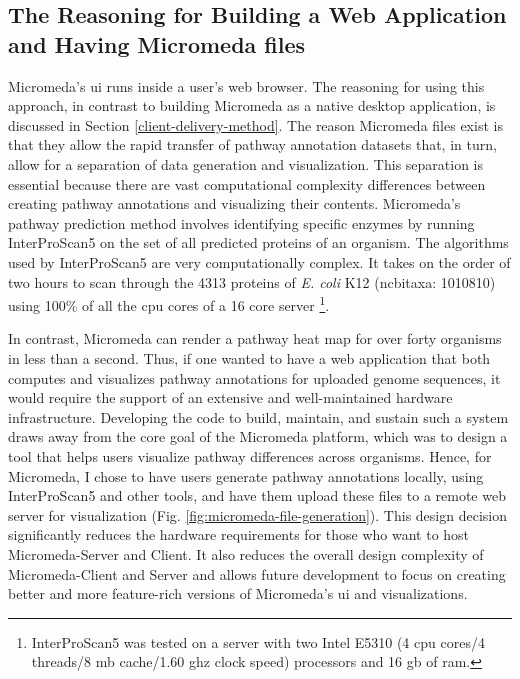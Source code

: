 \subsection{The Reasoning for Building a Web Application and Having Micromeda files} \label{why-micromeda-files}

Micromeda's \gls{ui} runs inside a user's web browser. The reasoning for using this approach, in contrast to building Micromeda as a native desktop application, is discussed in Section \ref{client-delivery-method}. The reason Micromeda files exist is that they allow the rapid transfer of pathway annotation datasets that, in turn, allow for a separation of data generation and visualization. This separation is essential because there are vast computational complexity differences between creating pathway annotations and visualizing their contents. Micromeda's pathway prediction method involves identifying specific enzymes by running InterProScan5 on the set of all predicted proteins of an organism. The algorithms used by InterProScan5 are very computationally complex. It takes on the order of two hours to scan through the 4313 proteins of \textit{E. coli} K12 (\gls{ncbitaxa}: 1010810) using 100\% of all the \gls{cpu} cores of a 16 core server \footnote{InterProScan5 was tested on a server with two Intel E5310 (4 \gls{cpu} cores/4 threads/8 \gls{mb} cache/1.60 \gls{ghz} clock speed) processors and 16 \gls{gb}  of \gls{ram}.}.

In contrast, Micromeda can render a pathway heat map for over forty organisms in less than a second. Thus, if one wanted to have a web application that both computes and visualizes pathway annotations for uploaded genome sequences, it would require the support of an extensive and well-maintained hardware infrastructure. Developing the code to build, maintain, and sustain such a system draws away from the core goal of the Micromeda platform, which was to design a tool that helps users visualize pathway differences across organisms. Hence, for Micromeda, I chose to have users generate pathway annotations locally, using InterProScan5 and other tools, and have them upload these files to a remote web server for visualization (Fig. \ref{fig:micromeda-file-generation}). This design decision significantly reduces the hardware requirements for those who want to host Micromeda-Server and Client. It also reduces the overall design complexity of Micromeda-Client and Server and allows future development to focus on creating better and more feature-rich versions of Micromeda's \gls{ui} and visualizations.

